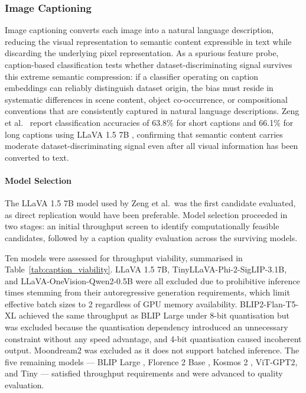 \subsubsection{Image Captioning}

Image captioning converts each image into a natural language description, 
reducing the visual representation to semantic content expressible in text 
while discarding the underlying pixel representation. As a spurious feature probe, 
caption-based classification tests whether dataset-discriminating signal 
survives this extreme semantic compression: if a classifier operating on 
caption embeddings can reliably distinguish dataset origin, the bias must 
reside in systematic differences in scene content, object co-occurrence, 
or compositional conventions that are consistently captured in natural 
language descriptions. Zeng et al.\ 
\cite{Zeng_2024_UnderstandingBiasinLargeScaleVisualDatasets} report 
classification accuracies of 63.8\% for short captions and 66.1\% for 
long captions using LLaVA 1.5 7B \cite{Liu_2023_LLaVA}, confirming that 
semantic content carries moderate dataset-discriminating signal even after 
all visual information has been converted to text.

\paragraph{Model Selection}
The LLaVA 1.5 7B model used by Zeng et al.\ was the first candidate 
evaluated, as direct replication would have been preferable. Model 
selection proceeded in two stages: an initial throughput screen to 
identify computationally feasible candidates, followed by a caption 
quality evaluation across the surviving models.

Ten models were assessed for throughput viability, summarised in 
Table~\ref{tab:caption_viability}. LLaVA 1.5 7B, 
TinyLLaVA-Phi-2-SigLIP-3.1B, and LLaVA-OneVision-Qwen2-0.5B were all 
excluded due to prohibitive inference times stemming from their 
autoregressive generation requirements, which limit effective batch sizes 
to 2 regardless of GPU memory availability. BLIP2-Flan-T5-XL achieved 
the same throughput as BLIP Large under 8-bit quantisation but was 
excluded because the quantisation dependency introduced an unnecessary 
constraint without any speed advantage, and 4-bit quantisation caused 
incoherent output. Moondream2 was excluded as it does not support batched 
inference. The five remaining models — BLIP Large \cite{Li_2022_BLIP}, 
Florence 2 Base \cite{Xiao_2024_Florence2}, Kosmos 2 
\cite{Peng_2023_Kosmos2}, ViT-GPT2, and Tiny — satisfied throughput 
requirements and were advanced to quality evaluation.

